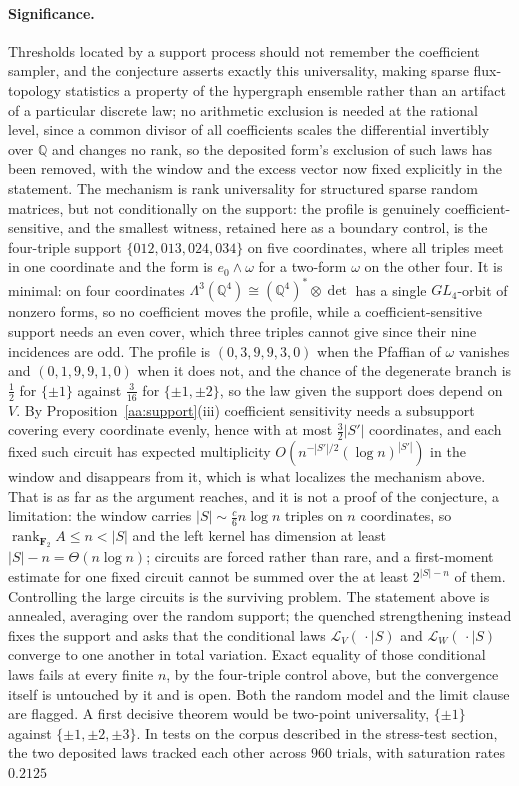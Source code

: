 \documentclass[11pt]{article}
\theoremstyle{definition}
\newcommand{\Q}{\mathbb Q}
\providecommand{\Q}{\mathbb Q}
\begin{document}
\paragraph{Significance.}
Thresholds located by a support process should not remember the coefficient sampler, and the conjecture asserts exactly this universality, making sparse flux-topology statistics a property of the hypergraph ensemble rather than an artifact of a particular discrete law; no arithmetic exclusion is needed at the rational level, since a common divisor of all coefficients scales the differential invertibly over $\Q$ and changes no rank, so the deposited form's exclusion of such laws has been removed, with the window and the excess vector now fixed explicitly in the statement.  The mechanism is rank universality for structured sparse random matrices, but not conditionally on the support: the profile is genuinely coefficient-sensitive, and the smallest witness, retained here as a boundary control, is the four-triple support $\{012,013,024,034\}$ on five coordinates, where all triples meet in one coordinate and the form is $e_0\wedge\omega$ for a two-form $\omega$ on the other four.  It is minimal: on four coordinates $\Lambda^3(\mathbb Q^4)\cong(\mathbb Q^4)^{*}\otimes\det$ has a single $GL_4$-orbit of nonzero forms, so no coefficient moves the profile, while a coefficient-sensitive support needs an even cover, which three triples cannot give since their nine incidences are odd.  The profile is $(0,3,9,9,3,0)$ when the Pfaffian of $\omega$ vanishes and $(0,1,9,9,1,0)$ when it does not, and the chance of the degenerate branch is $\tfrac12$ for $\{\pm1\}$ against $\tfrac3{16}$ for $\{\pm1,\pm2\}$, so the law given the support does depend on $V$.  By Proposition~\ref{aa:support}(iii) coefficient sensitivity needs a subsupport covering every coordinate evenly, hence with at most $\tfrac32|S'|$ coordinates, and each fixed such circuit has expected multiplicity $O(n^{-|S'|/2}(\log n)^{|S'|})$ in the window and disappears from it, which is what localizes the mechanism above.  That is as far as the argument reaches, and it is not a proof of the conjecture, a limitation: the window carries $|S|\sim\tfrac c6n\log n$ triples on $n$ coordinates, so $\operatorname{rank}_{\mathbf F_2}A\le n<|S|$ and the left kernel has dimension at least $|S|-n=\Theta(n\log n)$; circuits are forced rather than rare, and a first-moment estimate for one fixed circuit cannot be summed over the at least $2^{|S|-n}$ of them.  Controlling the large circuits is the surviving problem.  The statement above is annealed, averaging over the random support; the quenched strengthening instead fixes the support and asks that the conditional laws $\mathcal L_V(\,\cdot\mid S)$ and $\mathcal L_W(\,\cdot\mid S)$ converge to one another in total variation.  Exact equality of those conditional laws fails at every finite $n$, by the four-triple control above, but the convergence itself is untouched by it and is open.  Both the random model and the limit clause are flagged.  A first decisive theorem would be two-point universality, $\{\pm1\}$ against $\{\pm1,\pm2,\pm3\}$.  In tests on the corpus described in the stress-test section, the two deposited laws tracked each other across $960$ trials, with saturation rates $0.2125$ 
\end{document}
